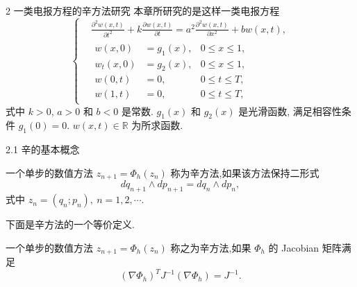 \documentclass{beamer}
\begin{document}
\begin{frame}{2 一类电报方程的辛方法研究}
\qquad 本章所研究的是这样一类电报方程
\begin{equation}\label{eq:tele}
\left\lbrace
\begin{aligned}
&\frac{\partial ^2 w(x,t)}{\partial t^2}+k\frac{\partial w(x,t)}{\partial t}=a^2 \frac{\partial ^2 w(x,t)}{\partial x^2} + b w(x,t),\\
&\begin{aligned}
w(x,0)&=g_1(x),&0 \le x \le 1,\\
w_t(x,0)&=g_2(x),&0 \le x \le 1,\\
w(0,t)&=0,&0 \le t \le T,\\
w(1,t)&=0,&0 \le t \le T,
\end{aligned}
\end{aligned}
\right.
\end{equation}
式中 $k > 0$, $a>0$ 和 $b < 0$ 是常数. $g_1(x)$ 和 $g_2(x)$ 是光滑函数, 满足相容性条件 $g_1(0)=0$. $w(x,t) \in \mathbb{R}$ 为所求函数.
\end{frame}

\begin{frame}{2.1 辛的基本概念}
\begin{definition}[辛方法]
一个单步的数值方法 $z_{n+1}=\Phi_h(z_n)$ 称为辛方法,如果该方法保持二形式
\begin{equation*}
dq_{n+1}\wedge dp_{n+1}=dq_n\wedge dp_n,
\end{equation*}
式中 $z_n=(q_n;p_n),~n=1,2,\cdots$.
\end{definition}

下面是辛方法的一个等价定义.

\begin{definition}[辛方法]\label{def:symplectic}
一个单步的数值方法 $z_{n+1}=\Phi_h(z_n)$ 称之为辛方法,如果 $\Phi_h$ 的 Jacobian 矩阵满足
\begin{equation*}
(\nabla\Phi_h)^TJ^{-1}(\nabla\Phi_h)=J^{-1}.
\end{equation*}
\end{definition}
\end{frame}
\end{document}
